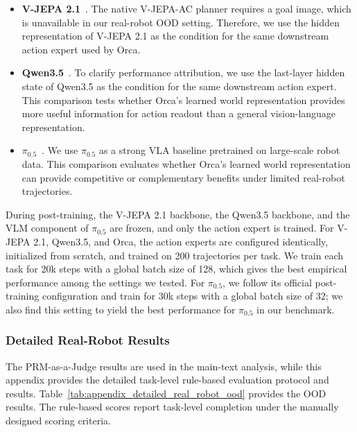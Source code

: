 \vspace{-2ex}
\begin{itemize}
    \item \textbf{V-JEPA 2.1}~\citep{V-JEPA-2.1}. 
    The native V-JEPA-AC planner requires a goal image, which is unavailable in our real-robot OOD setting. 
    Therefore, we use the hidden representation of V-JEPA 2.1 as the condition for the same downstream action expert used by Orca.

    \item \textbf{Qwen3.5}~\citep{qwen35}. 
    To clarify performance attribution, we use the last-layer hidden state of Qwen3.5 as the condition for the same downstream action expert. 
    This comparison tests whether Orca's learned world representation provides more useful information for action readout than a general vision-language representation.

    \item \textbf{$\pi_{0.5}$}~\citep{pi0.5}. 
    We use $\pi_{0.5}$ as a strong VLA baseline pretrained on large-scale robot data. 
    This comparison evaluates whether Orca's learned world representation can provide competitive or complementary benefits under limited real-robot trajectories.
\end{itemize}

During post-training, the V-JEPA 2.1 backbone, the Qwen3.5 backbone, and the VLM component of $\pi_{0.5}$ are frozen, and only the action expert is trained. 
For V-JEPA 2.1, Qwen3.5, and Orca, the action experts are configured identically, initialized from scratch, and trained on 200 trajectories per task. 
We train each task for 20k steps with a global batch size of 128, which gives the best empirical performance among the settings we tested. 
For $\pi_{0.5}$, we follow its official post-training configuration and train for 30k steps with a global batch size of 32; we also find this setting to yield the best performance for $\pi_{0.5}$ in our benchmark.




\subsubsection{Detailed Real-Robot Results}
\label{sec:appendix_evaluation_toA_results}
The PRM-as-a-Judge results are used in the main-text analysis, while this appendix provides the detailed task-level rule-based evaluation protocol and results. 
Table~\ref{tab:appendix_detailed_real_robot_ood} provides the OOD results. 
The rule-based scores report task-level completion under the manually designed scoring criteria. 




